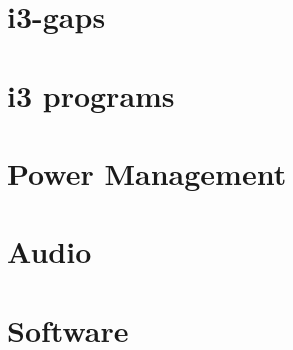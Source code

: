 \documentclass[10pt, a4paper, onecolumn, openany]{book} %
\begin{document}
\chapter{i3-gaps}


\chapter{i3 programs}


\chapter{Power Management}



\chapter{Audio}



\chapter{Software}
\end{document}
